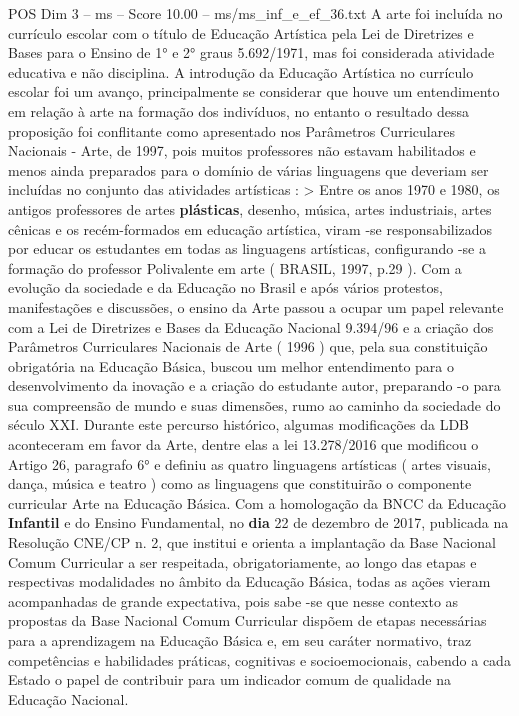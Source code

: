 \begin{textsample}{POS Dim 3 – ms – Score 10.00 – ms/ms\_inf\_e\_ef\_36.txt}
A arte foi incluída no currículo escolar com o título de Educação Artística pela Lei de Diretrizes e Bases para o Ensino de 1{\EmojiFont °} e 2{\EmojiFont °} graus 5.692/1971, mas foi considerada atividade educativa e não disciplina.
A introdução da Educação Artística no currículo escolar foi um avanço, principalmente se considerar que houve um entendimento em relação à arte na formação dos indivíduos, no entanto o resultado dessa proposição foi conflitante como apresentado nos Parâmetros Curriculares Nacionais - Arte, de 1997, pois muitos professores não estavam habilitados e menos ainda preparados para o domínio de várias linguagens que deveriam ser incluídas no conjunto das atividades artísticas : > Entre os anos 1970 e 1980, os antigos professores de artes \textbf{plásticas}, desenho, música, artes industriais, artes cênicas e os recém-formados em educação artística, viram -se responsabilizados por educar os estudantes em todas as linguagens artísticas, configurando -se a formação do professor Polivalente em arte ( BRASIL, 1997, p.29 ).
Com a evolução da sociedade e da Educação no Brasil e após vários protestos, manifestações e discussões, o ensino da Arte passou a ocupar um papel relevante com a Lei de Diretrizes e Bases da Educação Nacional 9.394/96 e a criação dos Parâmetros Curriculares Nacionais de Arte ( 1996 ) que, pela sua constituição obrigatória na Educação Básica, buscou um melhor entendimento para o desenvolvimento da inovação e a criação do estudante autor, preparando -o para sua compreensão de mundo e suas dimensões, rumo ao caminho da sociedade do século XXI.
Durante este percurso histórico, algumas modificações da LDB aconteceram em favor da Arte, dentre elas a lei 13.278/2016 que modificou o Artigo 26, paragrafo 6{\EmojiFont °} e definiu as quatro linguagens artísticas ( artes visuais, dança, música e teatro ) como as linguagens que constituirão o componente curricular Arte na Educação Básica.
Com a homologação da BNCC da Educação \textbf{Infantil} e do Ensino Fundamental, no \textbf{dia} 22 de dezembro de 2017, publicada na Resolução CNE/CP n. 2, que institui e orienta a implantação da Base Nacional Comum Curricular a ser respeitada, obrigatoriamente, ao longo das etapas e respectivas modalidades no âmbito da Educação Básica, todas as ações vieram acompanhadas de grande expectativa, pois sabe -se que nesse contexto as propostas da Base Nacional Comum Curricular dispõem de etapas necessárias para a aprendizagem na Educação Básica e, em seu caráter normativo, traz competências e habilidades práticas, cognitivas e socioemocionais, cabendo a cada Estado o papel de contribuir para um indicador comum de qualidade na Educação Nacional.

\end{textsample}
